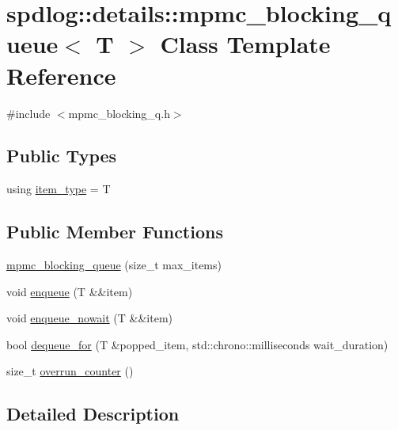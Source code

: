 \hypertarget{classspdlog_1_1details_1_1mpmc__blocking__queue}{}\section{spdlog\+:\+:details\+:\+:mpmc\+\_\+blocking\+\_\+queue$<$ T $>$ Class Template Reference}
\label{classspdlog_1_1details_1_1mpmc__blocking__queue}


{\ttfamily \#include $<$mpmc\+\_\+blocking\+\_\+q.\+h$>$}

\subsection*{Public Types}
\begin{DoxyCompactItemize}
\item 
using \hyperlink{classspdlog_1_1details_1_1mpmc__blocking__queue_abb22a6f25c5fd96af5b163dc93eec397}{item\+\_\+type} = T
\end{DoxyCompactItemize}
\subsection*{Public Member Functions}
\begin{DoxyCompactItemize}
\item 
\hyperlink{classspdlog_1_1details_1_1mpmc__blocking__queue_ace609561c8f631202988ec49f95422fa}{mpmc\+\_\+blocking\+\_\+queue} (size\+\_\+t max\+\_\+items)
\item 
void \hyperlink{classspdlog_1_1details_1_1mpmc__blocking__queue_a3795640b651fcb2de66a21ef2bc221f1}{enqueue} (T \&\&item)
\item 
void \hyperlink{classspdlog_1_1details_1_1mpmc__blocking__queue_a1280489c9035a705f50f04905a5ed394}{enqueue\+\_\+nowait} (T \&\&item)
\item 
bool \hyperlink{classspdlog_1_1details_1_1mpmc__blocking__queue_af4015ea1657b393755f34d76c97a28d1}{dequeue\+\_\+for} (T \&popped\+\_\+item, std\+::chrono\+::milliseconds wait\+\_\+duration)
\item 
size\+\_\+t \hyperlink{classspdlog_1_1details_1_1mpmc__blocking__queue_a15e3d12dff953034d5aad5590b8282cd}{overrun\+\_\+counter} ()
\end{DoxyCompactItemize}


\subsection{Detailed Description}
